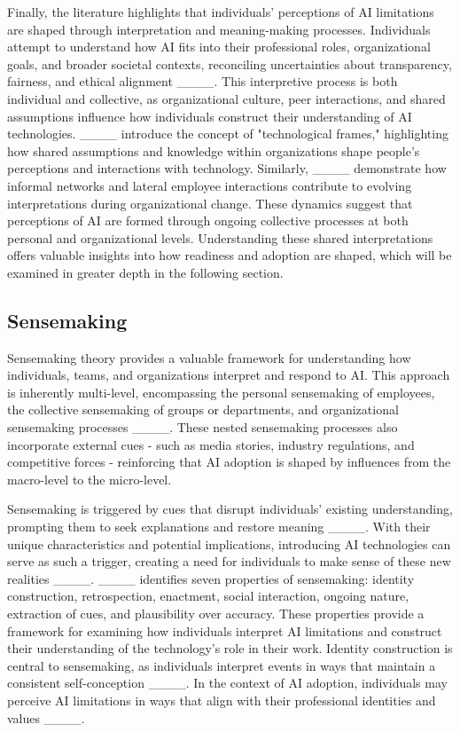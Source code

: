 Finally, the literature highlights that individuals' perceptions of AI limitations are shaped through interpretation and meaning-making processes. Individuals attempt to understand how AI fits into their professional roles, organizational goals, and broader societal contexts, reconciling uncertainties about transparency, fairness, and ethical alignment ____. This interpretive process is both individual and collective, as organizational culture, peer interactions, and shared assumptions influence how individuals construct their understanding of AI technologies. ____ introduce the concept of "technological frames," highlighting how shared assumptions and knowledge within organizations shape people's perceptions and interactions with technology. Similarly, ____ demonstrate how informal networks and lateral employee interactions contribute to evolving interpretations during organizational change. These dynamics suggest that perceptions of AI are formed through ongoing collective processes at both personal and organizational levels. Understanding these shared interpretations offers valuable insights into how readiness and adoption are shaped, which will be examined in greater depth in the following section.

\vspace{-3mm}
\subsection{Sensemaking}

Sensemaking theory provides a valuable framework for understanding how individuals, teams, and organizations interpret and respond to AI. This approach is inherently multi-level, encompassing the personal sensemaking of employees, the collective sensemaking of groups or departments, and organizational sensemaking processes ____. These nested sensemaking processes also incorporate external cues - such as media stories, industry regulations, and competitive forces - reinforcing that AI adoption is shaped by influences from the macro-level to the micro-level.

Sensemaking is triggered by cues that disrupt individuals' existing understanding, prompting them to seek explanations and restore meaning ____. With their unique characteristics and potential implications, introducing AI technologies can serve as such a trigger, creating a need for individuals to make sense of these new realities ____. ____ identifies seven properties of sensemaking: identity construction, retrospection, enactment, social interaction, ongoing nature, extraction of cues, and plausibility over accuracy. These properties provide a framework for examining how individuals interpret AI limitations and construct their understanding of the technology's role in their work. Identity construction is central to sensemaking, as individuals interpret events in ways that maintain a consistent self-conception ____. In the context of AI adoption, individuals may perceive AI limitations in ways that align with their professional identities and values ____.

